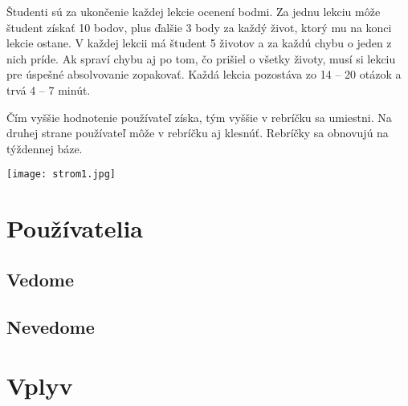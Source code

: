 \documentclass[10pt,twoside,slovak,a4paper]{article}
\begin{document}
Študenti sú za ukončenie každej lekcie ocenení bodmi. Za jednu lekciu môže študent získať 10 bodov, plus ďalšie 3 body za každý život, ktorý mu na konci lekcie ostane. V každej lekcii má študent 5 životov a za každú chybu o jeden z nich príde. Ak spraví chybu aj po tom, čo prišiel o všetky životy, musí si lekciu pre úspešné absolvovanie zopakovať. Každá lekcia pozostáva zo 14 – 20 otázok a trvá 4 – 7 minút. \cite{Duolingo} 

Čím vyššie hodnotenie používateľ získa, tým vyššie v rebríčku sa umiestni. Na druhej strane používateľ môže v rebríčku aj klesnúť. Rebríčky sa obnovujú na týždennej báze.\cite{HadiMogavi2022}


\texttt{[image: strom1.jpg]} %





\section{Používatelia} \label{Používatelia}

\subsection{Vedome} \label{Vedome}

\subsection{Nevedome} \label{Nevedome}




\section{Vplyv} \label{Vplyv}
\end{document}

